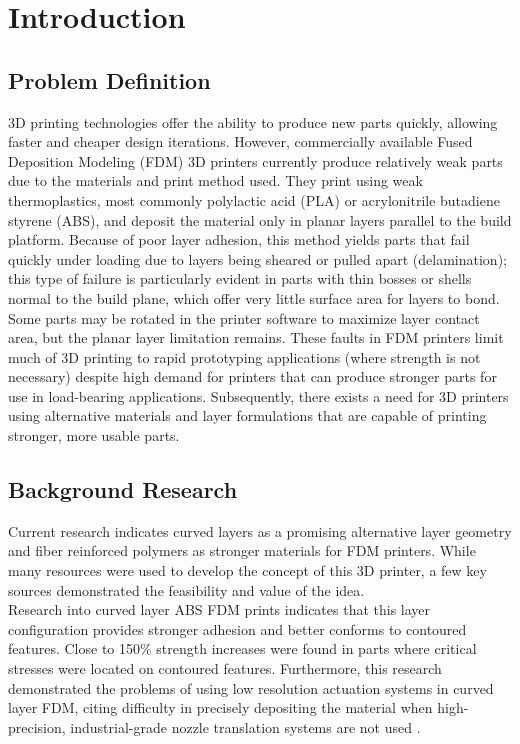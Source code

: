 \section{Introduction}

\subsection{Problem Definition}

\indent

3D printing technologies offer the ability to produce new parts quickly, allowing faster and cheaper design iterations. However, commercially available Fused Deposition Modeling (FDM) 3D printers currently produce relatively weak parts due to the materials and print method used. They print using weak thermoplastics, most commonly polylactic acid (PLA) or acrylonitrile butadiene styrene (ABS), and deposit the material only in planar layers parallel to the build platform. Because of poor layer adhesion, this method yields parts that fail quickly under loading due to layers being sheared or pulled apart (delamination); this type of failure is particularly evident in parts with thin bosses or shells normal to the build plane, which offer very little surface area for layers to bond. Some parts may be rotated in the printer software to maximize layer contact area, but the planar layer limitation remains. These faults in FDM printers limit much of 3D printing to rapid prototyping applications (where strength is not necessary) despite high demand for printers that can produce stronger parts for use in load-bearing applications. Subsequently, there exists a need for 3D printers using alternative materials and layer formulations that are capable of printing stronger, more usable parts.\\

\subsection{Background Research}

\indent

Current research indicates curved layers as a promising alternative layer geometry and fiber reinforced polymers as stronger  materials for FDM printers. While many resources were used to develop the concept of this 3D printer, a few key sources demonstrated the feasibility and value of the idea.\\

Research into curved layer ABS FDM prints indicates that this layer configuration provides stronger adhesion and better conforms to contoured features. Close to 150\% strength increases were found in parts where critical stresses were located on contoured features. Furthermore, this research demonstrated the problems of using low resolution actuation systems in curved layer FDM, citing difficulty in precisely depositing the material when high-precision, industrial-grade nozzle translation systems are not used \cite{cute-curves}.\\

